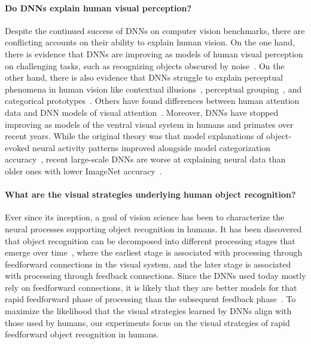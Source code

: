 \paragraph{Do DNNs explain human visual perception?} Despite the continued success of DNNs on computer vision benchmarks, there are conflicting accounts on their ability to explain human vision. On the one hand, there is evidence that DNNs are improving as models of human visual perception on challenging tasks, such as recognizing objects obscured by noise~\cite{Geirhos2021-rr}. On the other hand, there is also evidence that DNNs struggle to explain perceptual phenomena in human vision like contextual illusions~\cite{Linsley2020-en}, perceptual grouping~\cite{Kim2020-yw,Linsley2021-vx,Geirhos2020-nl}, and categorical prototypes~\cite{Golan2020-zw}. Others have found differences between human attention data and DNN models of visual attention~\cite{Linsley2019-ew,Langlois2021-ns}. Moreover, DNNs have stopped improving as models of the ventral visual system in humans and primates over recent years. While the original theory was that model explanations of object-evoked neural activity patterns improved alongside model categorization accuracy~\cite{Yamins2014-ba}, recent large-scale DNNs are worse at explaining neural data than older ones with lower ImageNet accuracy~\cite{Schrimpf2020-wp}.

\paragraph{What are the visual strategies underlying human object recognition?} Ever since its inception, a goal of vision science has been to characterize the neural processes supporting object recognition in humans. It has been discovered that object recognition can be decomposed into different processing stages that emerge over time~\cite{Fabre-Thorpe2011-js,Roelfsema2000-op,DiCarlo2012-nx,Serre2007-hq,Kietzmann2019-xy,Jagadeesh2022-df,Berrios2022-qm}, where the earliest stage is associated with processing through feedforward connections in the visual system, and the later stage is associated with processing through feedback connections. Since the DNNs used today mostly rely on feedforward connections, it is likely that they are better models for that rapid feedforward phase of processing than the subsequent feedback phase~\cite{Serre2019-bb, Serre2007-hq}. To maximize the likelihood that the visual strategies learned by DNNs align with those used by humans, our experiments focus on the visual strategies of rapid feedforward object recognition in humans.

